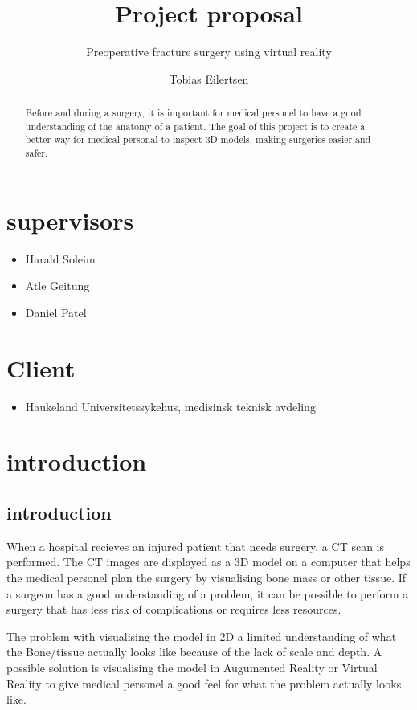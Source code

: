 \documentclass[11pt]{article}
\begin{document}
\title{Project proposal}
\subtitle{Preoperative fracture surgery using virtual reality}

\author{Tobias Eilertsen}
\maketitle


\section*{supervisors}
\begin{itemize}
  \item Harald Soleim
  \item Atle Geitung
  \item Daniel Patel
\end{itemize}
\section*{Client}
\begin{itemize}
  \item Haukeland Universitetssykehus, medisinsk teknisk avdeling
\end{itemize}

\begin{abstract}
  Before and during a surgery, it is important for medical personel to have a good understanding of the anatomy of a patient.
  The goal of this project is to create a better way for medical personal to inspect 3D models, making surgeries easier and safer.
\end{abstract}

\newpage
\section{introduction}


\subsection{introduction}

When a hospital recieves an injured patient that needs surgery, a CT scan is performed. The CT images are displayed as a 3D model on a computer that helps the medical personel plan the surgery by visualising bone mass or other tissue. If a surgeon has a good understanding of a problem, it can be possible to perform a surgery that has less risk of complications or requires less resources.


The problem with visualising the model in 2D a limited understanding of what the Bone/tissue actually looks like because of the lack of scale and depth. A possible solution is visualising the model in Augumented Reality or Virtual Reality to give medical personel a good feel for what the problem actually looks like. 
\end{document}

